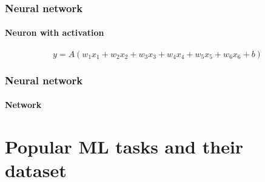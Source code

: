 \documentclass[10pt]{beamer}
\begin{document}
\begin{frame}
  \frametitle{Neural network}

  \framesubtitle{Neuron with activation}

  \begin{center}
    \scalebox{0.6}{
      
    }
  \end{center}

  \begin{center}
  \end{center}

  \vspace{-0.5cm}

  \[
  y = A(w_{1}x_{1} + w_{2}x_{2} + w_{3}x_{3} + w_{4}x_{4} + w_{5}x_{5} + w_{6}x_{6} + b)
  \]
\end{frame}

\begin{frame}
  \frametitle{Neural network}

  \framesubtitle{Network}

  \begin{center}
    \scalebox{0.7}{
      
    }
  \end{center}
\end{frame}

\section{Popular ML tasks and their dataset}
\end{document}
